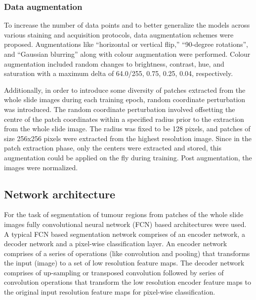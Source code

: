 \documentclass[times,twocolumn,final,authoryear]{tmp}
\begin{document}
\subsubsection{Data augmentation}
To increase the number of data points and to better generalize the models across various staining and acquisition protocols, data augmentation schemes were proposed. Augmentations like  “horizontal or vertical flip,” “90-degree rotations”, and “Gaussian blurring” along with colour augmentation were performed. Colour augmentation included random changes to brightness, contrast, hue, and saturation with a maximum delta of 64.0/255, 0.75, 0.25, 0.04, respectively.

Additionally, in order to introduce some diversity of patches extracted from the whole slide images during each training epoch, random coordinate perturbation was introduced. The random coordinate perturbation involved offsetting the centre of the patch coordinates within a specified radius prior to the extraction from the whole slide image. The radius was fixed to be 128 pixels, and patches of size 256x256 pixels were extracted from the highest resolution image. Since in the patch extraction phase, only the centers were extracted and stored, this augmentation could be applied on the fly during training. Post augmentation, the images were normalized.






\subsection{Network architecture}
\label{path_sec:path_networks}

For the task of segmentation of tumour regions from patches of the whole slide images fully convolutional neural network (FCN) \citep{long2015fully}  based architectures were used. A typical FCN based segmentation network comprises of an encoder network, a decoder network and a pixel-wise classification layer. An encoder network comprises of a series of operations (like convolution and pooling) that transforms the input (image) to a set of low resolution feature maps. The decoder network comprises of up-sampling or transposed convolution followed by series of convolution operations that transform the low resolution encoder feature maps to the original input resolution feature maps for pixel-wise classification. 
\end{document}

